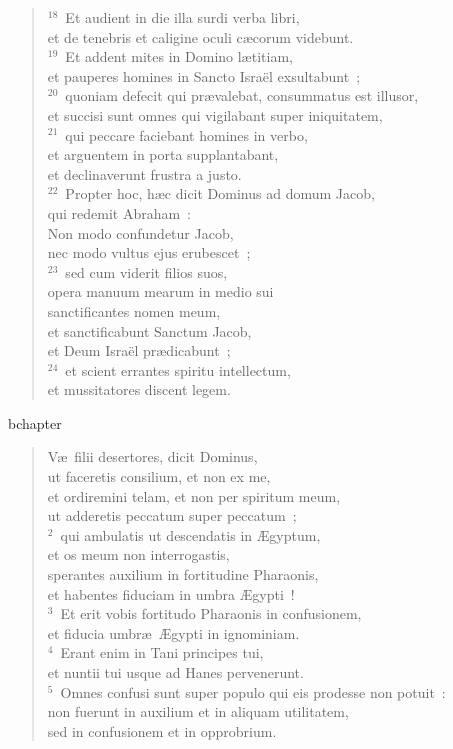\begin{verse}
${}^{18}$~Et audient in die illa surdi verba libri,\\ et de tenebris et caligine oculi c\ae corum videbunt.\\
${}^{19}$~Et addent mites in Domino l\ae titiam,\\ et pauperes homines in Sancto Isra\"el exsultabunt~;\\
${}^{20}$~quoniam defecit qui pr\ae valebat, consummatus est illusor,\\ et succisi sunt omnes qui vigilabant super iniquitatem,\\
${}^{21}$~qui peccare faciebant homines in verbo,\\ et arguentem in porta supplantabant,\\ et declinaverunt frustra a justo.\\
${}^{22}$~Propter hoc, h\ae c dicit Dominus ad domum Jacob,\\ qui redemit Abraham~:\\ Non modo confundetur Jacob,\\ nec modo vultus ejus erubescet~;\\
${}^{23}$~sed cum viderit filios suos,\\ opera manuum mearum in medio sui\\ sanctificantes nomen meum,\\ et sanctificabunt Sanctum Jacob,\\ et Deum Isra\"el pr\ae dicabunt~;\\
${}^{24}$~et scient errantes spiritu intellectum,\\ et mussitatores discent legem.\end{verse}


bchapter\begin{verse}\vspace{-19pt}V\ae\ filii desertores, dicit Dominus,\\ ut faceretis consilium, et non ex me,\\ et ordiremini telam, et non per spiritum meum,\\ ut adderetis peccatum super peccatum~;\\
${}^{2}$~qui ambulatis ut descendatis in \AE gyptum,\\ et os meum non interrogastis,\\ sperantes auxilium in fortitudine Pharaonis,\\ et habentes fiduciam in umbra \AE gypti~!\\
${}^{3}$~Et erit vobis fortitudo Pharaonis in confusionem,\\ et fiducia umbr\ae\ \AE gypti in ignominiam.\\
${}^{4}$~Erant enim in Tani principes tui,\\ et nuntii tui usque ad Hanes pervenerunt.\\
${}^{5}$~Omnes confusi sunt super populo qui eis prodesse non potuit~:\\ non fuerunt in auxilium et in aliquam utilitatem,\\ sed in confusionem et in opprobrium.\end{verse}


